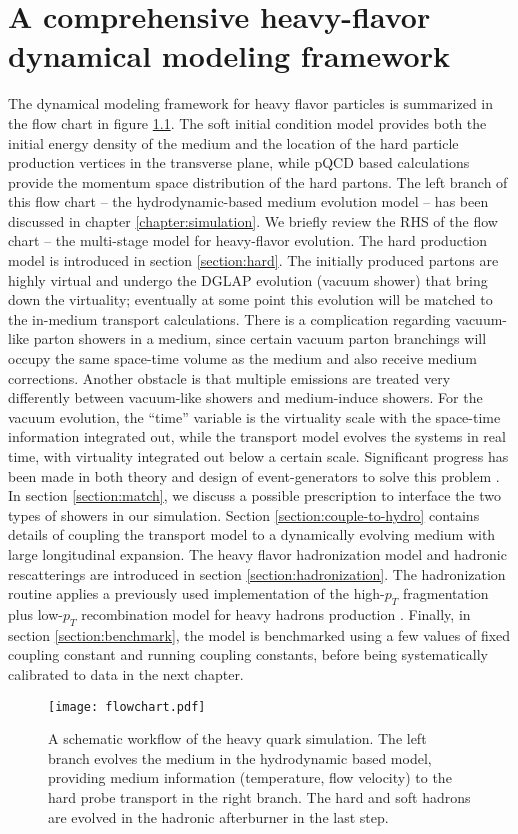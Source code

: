 \chapter{A comprehensive heavy-flavor dynamical modeling framework}
\label{chapter:coupling}
The dynamical modeling framework for heavy flavor particles is summarized in the flow chart in figure \ref{fig:flowchart}.
The soft initial condition model provides both the initial energy density of the medium and the location of the hard particle production vertices in the transverse plane, while pQCD based calculations provide the momentum space distribution of the hard partons.
The left branch of this flow chart -- the hydrodynamic-based medium evolution model -- has been discussed in chapter \ref{chapter:simulation}.
We briefly review the RHS of the flow chart -- the multi-stage model for heavy-flavor evolution.
The hard production model is introduced in section \ref{section:hard}.
The initially produced partons are highly virtual and undergo the DGLAP evolution (vacuum shower) that bring down the virtuality; eventually at some point this evolution will be matched to the in-medium transport calculations.
There is a complication regarding vacuum-like parton showers in a medium, since certain vacuum parton branchings will occupy the same space-time volume as the medium and also receive medium corrections.
Another obstacle is that multiple emissions are treated very differently between vacuum-like showers and medium-induce showers.
For the vacuum evolution, the ``time'' variable is the virtuality scale with the space-time information integrated out, while the transport model evolves the systems in real time, with virtuality integrated out below a certain scale.
Significant progress has been made in both theory and design of event-generators to solve this problem \cite{MehtarTani:2012cy,Mehtar-Tani:2017ypq,Cao:2017zih,Kauder:2018cdt,Putschke:2019yrg,PhysRevLett.120.232001,Caucal:2018ofz}.
In section \ref{section:match}, we discuss a possible prescription to interface the two types of showers in our simulation.
Section \ref{section:couple-to-hydro} contains details of coupling the transport model to a dynamically evolving medium with large longitudinal expansion.
The heavy flavor hadronization model and hadronic rescatterings are introduced in section \ref{section:hadronization}.
The hadronization routine applies a previously used implementation \cite{Cao:2013ita} of the high-$p_T$ fragmentation plus low-$p_T$ recombination model for heavy hadrons production \cite{Oh:2009zj}.
Finally, in section \ref{section:benchmark}, the model is benchmarked using a few values of fixed coupling constant and running coupling constants, before being systematically calibrated to data in the next chapter.
\begin{figure}
\centering
\texttt{[image: flowchart.pdf]}
\caption{A schematic workflow of the heavy quark simulation. The left branch evolves the medium in the hydrodynamic based model, providing medium information (temperature, flow velocity) to the hard probe transport in the right branch. The hard and soft hadrons are evolved in the hadronic afterburner in the last step.}
\label{fig:flowchart}
\end{figure}

